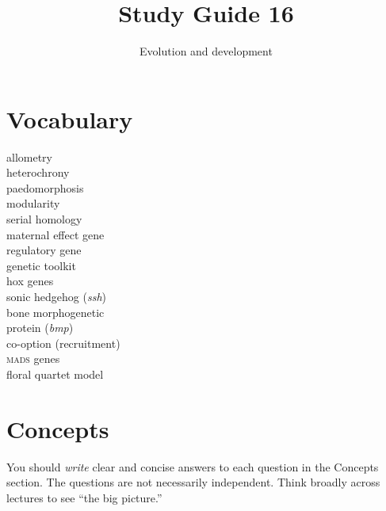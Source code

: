 \documentclass[letterpaper]{tufte-handout}
\title{Study Guide 16\hfill}
\author{Evolution and development}
\date{} %
\begin{document}
\maketitle	%

\section{Vocabulary}

\begin{multicols}{2}
allometry \\
heterochrony \\
paedomorphosis \\
modularity \\
serial homology\\
maternal effect gene \\
regulatory gene \\
genetic toolkit \\
hox genes\\
sonic hedgehog (\textit{ssh})\\
bone morphogenetic\\\hspace{1em}protein (\textit{bmp})\\
co-option (recruitment) \\
\textsc{mads} genes \\
floral quartet model
\end{multicols}


\section{Concepts}

You should \emph{write} clear and concise answers to each question in the Concepts section.  The questions are not necessarily independent.  Think broadly across lectures to see ``the big picture.'' 
\end{document}
